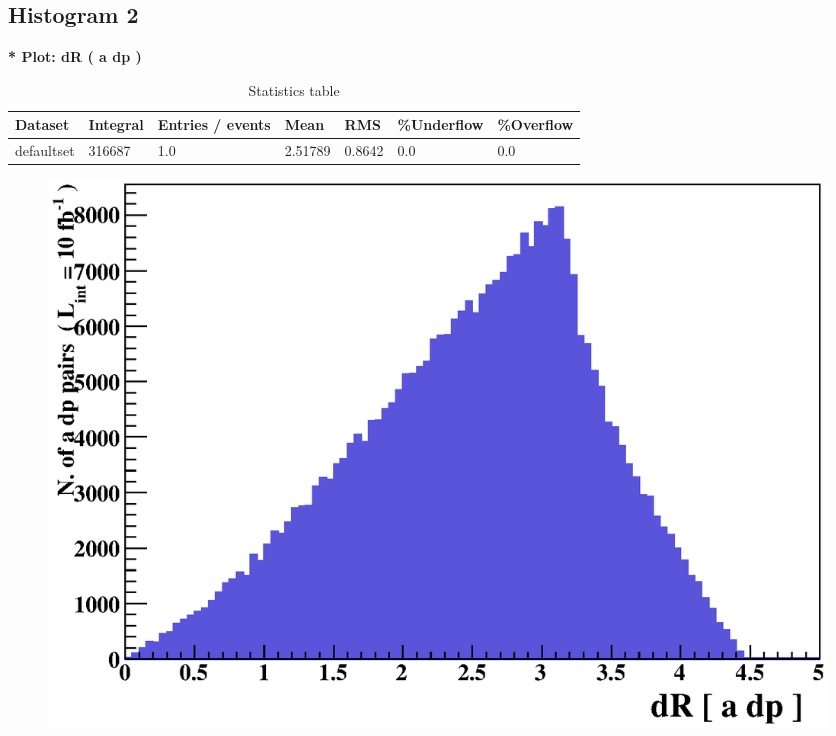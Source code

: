 \documentclass[a4paper, 11pt]{article}
\begin{document}
\subsection{ Histogram 2}

   \textbf{   * Plot: dR ( a dp ) }
\textbf{ }\begin{table}[!h]
  \begin{center}
    \caption{ Statistics table}
    \begin{tabular}{|m{17.0mm}|m{27.0mm}|m{23.0mm}|m{18.0mm}|m{18.0mm}|m{14.0mm}|m{14.0mm}|}
      \hline
      \cellcolor{yellow}         Dataset& \cellcolor{yellow}         Integral& \cellcolor{yellow}         Entries /\- events& \cellcolor{yellow}         Mean& \cellcolor{yellow}         RMS& \cellcolor{yellow}         \%Underflow& \cellcolor{yellow}         \%Overflow\\
      \hline
      \cellcolor{white}         defaultset& \cellcolor{white}         316687& \cellcolor{white}         1.0& \cellcolor{white}         2.51789& \cellcolor{white}         0.8642& \cellcolor{green}         0.0& \cellcolor{green}         0.0\\
\hline
    \end{tabular}
  \end{center}
\end{table}

\begin{figure}[!h]
  \begin{center}
    \includegraphics[scale=0.6]{selection_1.eps}\\
\caption{}
  \end{center}
\end{figure}
\newpage
   
\end{document}

